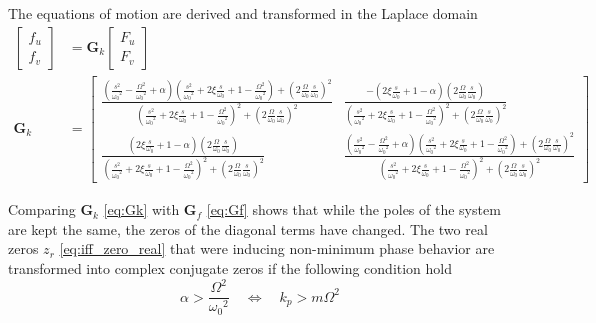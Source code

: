 \documentclass[Afour,sagev,times]{sagej}
\begin{document}
The equations of motion are derived and transformed in the Laplace domain
\begin{align}
\begin{bmatrix} f_u \\ f_v \end{bmatrix} &=
\bm{G}_k
\begin{bmatrix} F_u \\ F_v \end{bmatrix} \label{eq:Gk_mimo_tf} \\
\bm{G}_k &=
\begin{bmatrix}
  \frac{\left( \frac{s^2}{{\omega_0}^2} - \frac{\Omega^2}{{\omega_0}^2} + \alpha \right) \left( \frac{s^2}{{\omega_0}^2} + 2 \xi \frac{s}{\omega_0} + 1 - \frac{{\Omega}^2}{{\omega_0}^2} \right) + \left( 2 \frac{\Omega}{\omega_0} \frac{s}{\omega_0} \right)^2}{\left( \frac{s^2}{{\omega_0}^2} + 2 \xi \frac{s}{\omega_0} + 1 - \frac{{\Omega}^2}{{\omega_0}^2} \right)^2 + \left( 2 \frac{\Omega}{\omega_0} \frac{s}{\omega_0} \right)^2} & \frac{- \left( 2 \xi \frac{s}{\omega_0} + 1 - \alpha \right) \left( 2 \frac{\Omega}{\omega_0} \frac{s}{\omega_0} \right)}{\left( \frac{s^2}{{\omega_0}^2} + 2 \xi \frac{s}{\omega_0} + 1 - \frac{{\Omega}^2}{{\omega_0}^2} \right)^2 + \left( 2 \frac{\Omega}{\omega_0} \frac{s}{\omega_0} \right)^2} \\
  \frac{\left( 2 \xi \frac{s}{\omega_0} + 1 - \alpha \right) \left( 2 \frac{\Omega}{\omega_0} \frac{s}{\omega_0} \right)}{\left( \frac{s^2}{{\omega_0}^2} + 2 \xi \frac{s}{\omega_0} + 1 - \frac{{\Omega}^2}{{\omega_0}^2} \right)^2 + \left( 2 \frac{\Omega}{\omega_0} \frac{s}{\omega_0} \right)^2} & \frac{\left( \frac{s^2}{{\omega_0}^2} - \frac{\Omega^2}{{\omega_0}^2} + \alpha \right) \left( \frac{s^2}{{\omega_0}^2} + 2 \xi \frac{s}{\omega_0} + 1 - \frac{{\Omega}^2}{{\omega_0}^2} \right) + \left( 2 \frac{\Omega}{\omega_0} \frac{s}{\omega_0} \right)^2}{\left( \frac{s^2}{{\omega_0}^2} + 2 \xi \frac{s}{\omega_0} + 1 - \frac{{\Omega}^2}{{\omega_0}^2} \right)^2 + \left( 2 \frac{\Omega}{\omega_0} \frac{s}{\omega_0} \right)^2}
\end{bmatrix} \label{eq:Gk}
\end{align}

Comparing \(\bm{G}_k\) \eqref{eq:Gk} with \(\bm{G}_f\) \eqref{eq:Gf} shows that while the poles of the system are kept the same, the zeros of the diagonal terms have changed.
The two real zeros \(z_r\) \eqref{eq:iff_zero_real} that were inducing non-minimum phase behavior are transformed into complex conjugate zeros if the following condition hold
\begin{equation}
\label{eq:kp_cond_cc_zeros}
  \alpha > \frac{\Omega^2}{{\omega_0}^2} \quad \Leftrightarrow \quad k_p > m \Omega^2
\end{equation}
\end{document}
